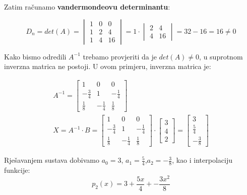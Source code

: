 Zatim računamo \textbf{vandermondeovu determinantu}:

$$
D_n =
det(A) =
\begin{vmatrix}
1 & 0 & 0 \\
1 & 2 & 4 \\
1 & 4 & 16
\end{vmatrix}
= 1 \cdot
\begin{vmatrix}
2 & 4 \\
4 & 16
\end{vmatrix}
= 32 - 16 = 16 \neq 0
$$

\begin{multicols}{2}

Kako bismo odredili $A^{-1}$ trebamo provjeriti da je $det(A)\neq0$, u suprotnom inverzna matrica ne postoji. U ovom primjeru, inverzna matrica je:

\begin{gather*}
A^{-1} =
\begin{bmatrix}
1 & 0 & 0\\
-{\frac{3}{4}} & 1 & -{\frac{1}{4}}\\
{\frac{1}{8}} & -{\frac{1}{4}} & {\frac{1}{8}}
\end{bmatrix}\\
X = A^{-1}\cdot B =
\begin{bmatrix}
1 & 0 & 0\\
-\frac{3}{4} & 1 & -\frac{1}{4}\\
\frac{1}{8} & -\frac{1}{4} & \frac{1}{8}
\end{bmatrix}
\cdot
\begin{bmatrix}
3 \\ 4 \\ 2
\end{bmatrix}
=
\begin{bmatrix}
3 \\ \frac{5}{4} \\ -\frac{3}{8}
\end{bmatrix}
\end{gather*}

Rješavanjem sustava dobivamo $a_0=3$, $a_1=\frac{5}{4}$,\break$a_2=-\frac{3}{8}$,
kao i interpolaciju funkcije:
$$
p_2(x) = 3 + \frac{5x}{4} + -\frac{3x^2}{8}
$$

\newcolumn

\vspace*{0pt}


\end{multicols}
